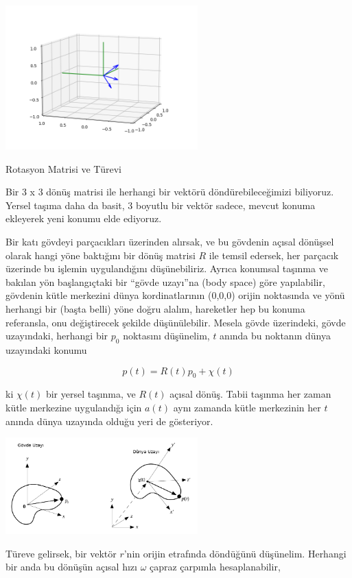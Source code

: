 \documentclass[12pt,fleqn]{article}\usepackage{../../common}
\begin{document}
\includegraphics[width=20em]{phy_005_basics_04_02.png}

Rotasyon Matrisi ve Türevi

Bir 3 x 3 dönüş matrisi ile herhangi bir vektörü döndürebileceğimizi biliyoruz.
Yersel taşıma daha da basit, 3 boyutlu bir vektör sadece, mevcut konuma
ekleyerek yeni konumu elde ediyoruz.

Bir katı gövdeyi parçacıkları üzerinden alırsak, ve bu gövdenin açısal dönüşsel
olarak hangi yöne baktığını bir dönüş matrisi $R$ ile temsil edersek, her
parçacık üzerinde bu işlemin uygulandığını düşünebiliriz. Ayrıca konumsal
taşınma ve bakılan yön başlangıçtaki bir ``gövde uzayı''na (body space) göre
yapılabilir, gövdenin kütle merkezini dünya kordinatlarının (0,0,0) orijin
noktasında ve yönü herhangi bir (başta belli) yöne doğru alalım, hareketler hep
bu konuma referansla, onu değiştirecek şekilde düşünülebilir.  Mesela gövde
üzerindeki, gövde uzayındaki, herhangi bir $p_0$ noktasını düşünelim, $t$ anında
bu noktanın dünya uzayındaki konumu

$$
p(t) = R(t) p_0 + \chi(t)
$$

ki $\chi(t)$ bir yersel taşınma, ve $R(t)$ açısal dönüş. Tabii taşınma her zaman
kütle merkezine uygulandığı için $a(t)$ aynı zamanda kütle merkezinin her $t$
anında dünya uzayında olduğu yeri de gösteriyor.

\includegraphics[width=20em]{phy_005_basics_04_04.png}

Türeve gelirsek, bir vektör $r$'nin orijin etrafında döndüğünü
düşünelim. Herhangi bir anda bu dönüşün açısal hızı $\omega$ çapraz çarpımla
hesaplanabilir,
\end{document}
